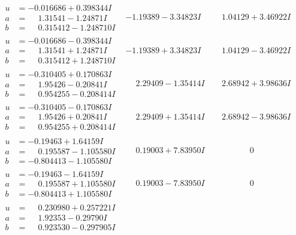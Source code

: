 \documentclass[1p]{elsarticle_modified}
\theoremstyle{definition}
\begin{document}
$$\begin{array}{c|c|c}
\begin{aligned}
u &= -0.016686 + 0.398344 I \\
a &= \phantom{-}1.31541 - 1.24871 I \\
b &= \phantom{-}0.315412 - 1.248710 I\end{aligned}
 & -1.19389 - 3.34823 I & \phantom{-}1.04129 + 3.46922 I \\ \hline\begin{aligned}
u &= -0.016686 - 0.398344 I \\
a &= \phantom{-}1.31541 + 1.24871 I \\
b &= \phantom{-}0.315412 + 1.248710 I\end{aligned}
 & -1.19389 + 3.34823 I & \phantom{-}1.04129 - 3.46922 I \\ \hline\begin{aligned}
u &= -0.310405 + 0.170863 I \\
a &= \phantom{-}1.95426 - 0.20841 I \\
b &= \phantom{-}0.954255 - 0.208414 I\end{aligned}
 & \phantom{-}2.29409 - 1.35414 I & \phantom{-}2.68942 + 3.98636 I \\ \hline\begin{aligned}
u &= -0.310405 - 0.170863 I \\
a &= \phantom{-}1.95426 + 0.20841 I \\
b &= \phantom{-}0.954255 + 0.208414 I\end{aligned}
 & \phantom{-}2.29409 + 1.35414 I & \phantom{-}2.68942 - 3.98636 I \\ \hline\begin{aligned}
u &= -0.19463 + 1.64159 I \\
a &= \phantom{-}0.195587 - 1.105580 I \\
b &= -0.804413 - 1.105580 I\end{aligned}
 & \phantom{-}0.19003 + 7.83950 I & \phantom{-0.000000 } 0 \\ \hline\begin{aligned}
u &= -0.19463 - 1.64159 I \\
a &= \phantom{-}0.195587 + 1.105580 I \\
b &= -0.804413 + 1.105580 I\end{aligned}
 & \phantom{-}0.19003 - 7.83950 I & \phantom{-0.000000 } 0 \\ \hline\begin{aligned}
u &= \phantom{-}0.230980 + 0.257221 I \\
a &= \phantom{-}1.92353 - 0.29790 I \\
b &= \phantom{-}0.923530 - 0.297905 I\end{aligned}

\end{array}$$
\end{document}
